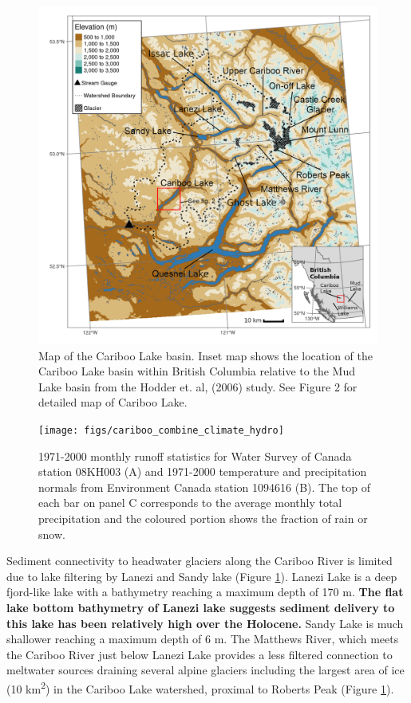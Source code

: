 \documentclass[Royal,times,doublespace,sageh]{sagej}
\begin{document}
\begin{figure}

{\centering \includegraphics[width=1\linewidth]{figs/cl_small_scale_inset_labels_gimp} 

}

\caption{Map of the Cariboo Lake basin. Inset map shows the location of the Cariboo Lake basin within British Columbia relative to the Mud Lake basin from the Hodder et. al, (2006) study. See Figure 2 for detailed map of Cariboo Lake.}\label{fig:map-basin}
\end{figure}

\begin{figure}

{\centering \texttt{[image: figs/cariboo\_combine\_climate\_hydro]} 

}

\caption{1971-2000 monthly runoff statistics for Water Survey of Canada station 08KH003 (A) and 1971-2000 temperature and precipitation normals from Environment Canada station 1094616 (B). The top of each bar on panel C corresponds to the average monthly total precipitation and the coloured portion shows the fraction of rain or snow.}\label{fig:cl-hydro}
\end{figure}

Sediment connectivity to headwater glaciers along the Cariboo River is
limited due to lake filtering by Lanezi and Sandy lake (Figure
\ref{fig:map-basin}). Lanezi Lake is a deep fjord-like lake with a
bathymetry reaching a maximum depth of 170 m. \textbf{The flat lake
bottom bathymetry of Lanezi lake suggests sediment delivery to this lake
has been relatively high over the Holocene.} Sandy Lake is much
shallower reaching a maximum depth of 6 m. The Matthews River, which
meets the Cariboo River just below Lanezi Lake provides a less filtered
connection to meltwater sources draining several alpine glaciers
including the largest area of ice (10 km\textsuperscript{2}) in the
Cariboo Lake watershed, proximal to Roberts Peak (Figure
\ref{fig:map-basin}).
\end{document}
